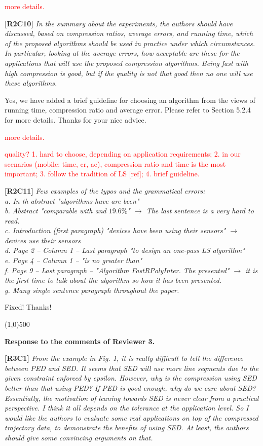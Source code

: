 \documentclass{letter}
\begin{document}
\textcolor{red}{more details.}

\textbf{[R2C10]} \emph{In the summary about the experiments, the authors should have discussed, based on compression ratios, average errors, and running time, which of the proposed algorithms should be used in practice under which circumstances. In particular, looking at the average errors, how acceptable are these for the applications that will use the proposed compression algorithms. Being fast with high compression is good, but if the quality is not that good then no one will use these algorithms.}

Yes, we have added a brief guideline for choosing an algorithm from the views of running time, compression ratio and average error. Please refer to Section 5.2.4 for more details. Thanks for your nice advice.

\textcolor{red}{more details.}

\textcolor{red}{quality? 1. hard to choose, depending on application requirements; 2. in our scenarios (mobile: time, cr, ae), compression ratio and time is the most important; 3. follow the tradition of LS [ref]; 4. brief guideline.}

\textbf{[R2C11]} \emph{Few examples of the typos and the grammatical errors: \\
   a. In th abstract "algorithms have are been"	\\
   b. Abstract "comparable with and $19.6\%$" $\rightarrow$ The last sentence is a very hard to read.	\\
   c. Introduction (first paragraph) "devices have been using their sensors" $\rightarrow$ devices use their sensors	\\
   d. Page 2 -- Column 1 -- Last paragraph "to design an one-pass LS algorithm" \\
   e. Page 4 -- Column 1 -- "is no greater than" \\
   f. Page 9 -- Last paragraph -- "Algorithm FastRPolyInter. The presented" $\rightarrow$ it is the first time to talk about the algorithm so how it has been presented. \\
   g. Many single sentence paragraph throughout the paper. 
}

Fixed! Thanks!


\line(1,0){500}

\textbf{Response to the comments of Reviewer 3.}

\textbf{[R3C1]} \emph{From the example in Fig. 1, it is really difficult to tell the difference between PED and SED. It seems that SED will use more line segments due to the given constraint enforced by epsilon. However, why is the compression using SED better than that using PED? If PED is good enough, why do we care about SED? Essentially, the motivation of leaning towards SED is never clear from a practical perspective. I think it all depends on the tolerance at the application level. So I would like the authors to evaluate some real applications on top of the compressed trajectory data, to demonstrate the benefits of using SED. At least, the authors should give some convincing arguments on that.}
\end{document}
